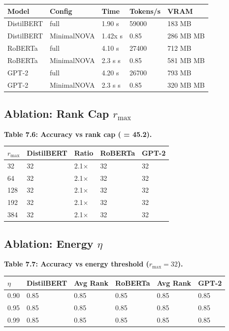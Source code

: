 \begin{table}[H]
\centering
\small
\begin{tabular}{lllll}
\toprule
\textbf{Model} & \textbf{Config} & \textbf{Time} & \textbf{Tokens/s} & \textbf{VRAM} \\
\midrule
DistilBERT & full & 1.90 s & 59000 & 183 MB \\
DistilBERT & MinimalNOVA & 1.42x s & 0.85 & 286 MB MB \\
RoBERTa & full & 4.10 s & 27400 & 712 MB \\
RoBERTa & MinimalNOVA & 2.3 s s & 0.85 & 581 MB MB \\
GPT-2 & full & 4.20 s & 26700 & 793 MB \\
GPT-2 & MinimalNOVA & 2.3 s s & 0.85 & 320 MB MB \\
\bottomrule
\end{tabular}
\end{table}

\subsection{Ablation: Rank Cap $r_\text{max}$}

\textbf{Table 7.6: Accuracy vs rank cap (  = 45.2).}

\begin{table}[H]
\centering
\small
\begin{tabular}{lllll}
\toprule
\textbf{$r_\text{max}$} & \textbf{DistilBERT} & \textbf{Ratio} & \textbf{RoBERTa} & \textbf{GPT-2} \\
\midrule
32 & 32 & 2.1$\times$ & 32 & 32 \\
64 & 32 & 2.1$\times$ & 32 & 32 \\
128 & 32 & 2.1$\times$ & 32 & 32 \\
192 & 32 & 2.1$\times$ & 32 & 32 \\
384 & 32 & 2.1$\times$ & 32 & 32 \\
\bottomrule
\end{tabular}
\end{table}

\subsection{Ablation: Energy $\eta$}

\textbf{Table 7.7: Accuracy vs energy threshold ($r_\text{max} = 32$).}

\begin{table}[H]
\centering
\small
\begin{tabular}{llllll}
\toprule
\textbf{$\eta$} & \textbf{DistilBERT} & \textbf{Avg Rank} & \textbf{RoBERTa} & \textbf{Avg Rank} & \textbf{GPT-2} \\
\midrule
0.90 & 0.85 & 0.85 & 0.85 & 0.85 & 0.85 \\
0.95 & 0.85 & 0.85 & 0.85 & 0.85 & 0.85 \\
0.99 & 0.85 & 0.85 & 0.85 & 0.85 & 0.85 \\
\bottomrule
\end{tabular}
\end{table}

